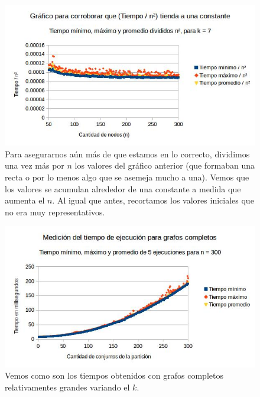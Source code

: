 \documentclass[a4paper]{article}
\begin{document}
\begin{figure}[h!]
\centering
\includegraphics[scale=0.7]{graficostiempohgolosa/tiempocompletoskfijo3.jpg}\caption{Para asegurarnos aún más de que estamos en lo correcto, dividimos una vez más por $n$ los valores del gráfico anterior (que formaban una recta o por lo menos algo que se asemeja mucho a una). Vemos que los valores se acumulan alrededor de una constante a medida que aumenta el $n$. Al igual que antes, recortamos los valores iniciales que no era muy representativos.}
\end{figure}

\begin{figure}[h!]
\centering
\includegraphics[scale=0.7]{graficostiempohgolosa/tiempocompletosnfijo.jpg}\caption{Vemos como son los tiempos obtenidos con grafos completos relativamentes grandes variando el $k$.}
\end{figure}
\end{document}
